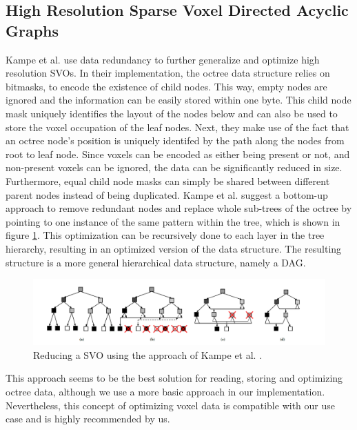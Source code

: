 \subsection{High Resolution Sparse Voxel Directed Acyclic Graphs} \label{subsec-highres-svo-dags}

Kampe et al. \cite{Kampe2013} use data redundancy to further generalize and optimize high resolution 
\ac{SVO}s. In their implementation, the octree data structure relies on bitmasks, to encode the existence of child 
nodes. This way, empty nodes are ignored and the information can be easily stored within one byte. This child node 
mask uniquely identifies the layout of the nodes below and can also be used to store the voxel occupation of the 
leaf nodes. Next, they make use of the fact that an octree node's position is uniquely identifed by the path along 
the nodes from root to leaf node. Since voxels can be encoded as either being present or not, and non-present 
voxels can be ignored, the data can be significantly reduced in size. Furthermore, equal child node masks 
can simply be shared between different parent nodes instead of being duplicated. Kampe et al. \cite{Kampe2013} 
suggest a bottom-up approach to remove redundant nodes and replace whole sub-trees of the octree by pointing to one 
instance of the same pattern within the tree, which is shown in figure \ref{fig:sparse-voxel-dag-creation}. 
This optimization can be recursively done to each layer in the tree hierarchy, resulting in an optimized version 
of the data structure. The resulting structure is a more general hierarchical data structure, namely a \ac{DAG}.

\begin{figure}[h]
    \centering
    \includegraphics[width=\linewidth]{images/graphics/highres-sv-dag.png}
    \caption{Reducing a \ac{SVO} using the approach of Kampe et al. \cite{Kampe2013}.}
    \label{fig:sparse-voxel-dag-creation}
\end{figure}

\noindent
This approach seems to be the best solution for reading, storing and optimizing octree data, although we use 
a more basic approach in our implementation. Nevertheless, this concept of optimizing voxel data is compatible 
with our use case and is highly recommended by us.

